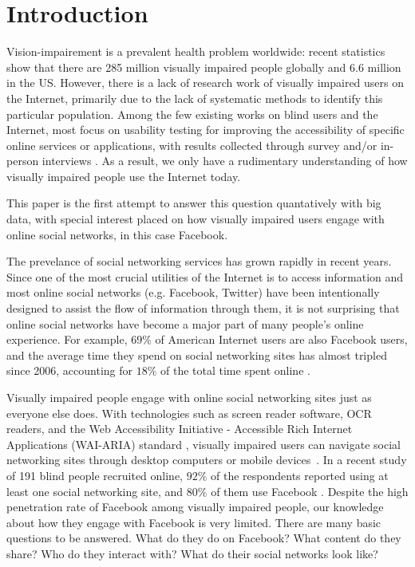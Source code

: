 \documentclass{sigchi}
\begin{document}


\section{Introduction}
Vision-impairement is a prevalent health problem worldwide:  recent statistics \cite{who_report, facts_about_blindness} show that there are 285 million visually impaired people globally and 6.6 million in the US. However, there is a lack of research work of visually impaired users on the Internet, primarily due to the lack of systematic methods to identify this particular population. Among the few existing works on blind users and the Internet, most focus on usability testing for improving the accessibility of specific  online services or applications, with results collected through survey and/or in-person interviews \cite{wentz2011, jayant2011, brady2013cscw, brady2013chi}.  As a result, we only have a rudimentary understanding of how visually impaired people use the Internet today. 

This paper is the first attempt to answer this question quantatively with big data, with special interest placed on how visually impaired users engage with online social networks, in this case Facebook.


The prevelance of social networking services has grown rapidly in  recent years. Since one of the most crucial utilities of the Internet is to access information and most online social networks (e.g. Facebook, Twitter) have been intentionally designed to assist the flow of information through them, it is not surprising that online social networks have become a major part of many people's online experience. For example,  $69\%$ of American Internet users are also Facebook users, and the average time they spend on social networking sites has almost tripled since 2006, accounting for $18\%$ of the total time spent online \cite{facebook_wiki,facebook_stat_wiki,sociallyaware}.

Visually impaired people engage with online social networking sites just as everyone else does. With technologies such as screen reader software, OCR readers, and the Web Accessibility Initiative - Accessible Rich Internet Applications (WAI-ARIA) standard \cite{wai-aria}, visually impaired users can navigate social networking sites through desktop computers or mobile devices~\cite{wentz2011}.  In a recent study of 191 blind people recruited online, $92\%$ of the respondents reported using at least one social networking site, and $80\%$ of them use Facebook \cite{brady2013cscw}.  Despite the high penetration rate of Facebook among visually impaired people, our knowledge about how they engage with Facebook is very limited. There are many basic questions to be answered. What do they do on Facebook? What content do they share? Who do they interact with? What do their social networks look like? 
\end{document}
